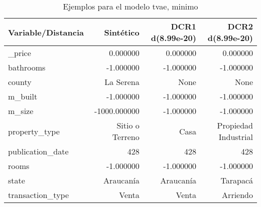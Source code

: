 \begin{table}[H]
\centering
\fontsize{10}{14}\selectfont
\caption{Ejemplos para el modelo tvae, minimo}
\label{table-example-economicos-b-3-tvae-min}
\begin{tabular}{|l|r|r|r|}
\hline
\rowcolor[gray]{0.8}
Variable/Distancia & Sintético & DCR1 d(8.99e-20) & DCR2 d(8.99e-20) \\
\hline \_price & \cellcolor[rgb]{0.9, 0.54, 0.52} 0.000000 & \cellcolor[rgb]{0.9, 0.54, 0.52} 0.000000 & \cellcolor[rgb]{0.9, 0.54, 0.52} 0.000000 \\
\hline bathrooms & \cellcolor[rgb]{0.9, 0.54, 0.52} -1.000000 & \cellcolor[rgb]{0.9, 0.54, 0.52} -1.000000 & \cellcolor[rgb]{0.9, 0.54, 0.52} -1.000000 \\
\hline county & \cellcolor[rgb]{0.9, 0.54, 0.52} La Serena & None & None \\
\hline m\_built & \cellcolor[rgb]{0.9, 0.54, 0.52} -1.000000 & \cellcolor[rgb]{0.9, 0.54, 0.52} -1.000000 & \cellcolor[rgb]{0.9, 0.54, 0.52} -1.000000 \\
\hline m\_size & \cellcolor[rgb]{0.9, 0.54, 0.52} -1000.000000 & \cellcolor[rgb]{0.9, 0.54, 0.52} -1.000000 & \cellcolor[rgb]{0.9, 0.54, 0.52} -1.000000 \\
\hline property\_type & \cellcolor[rgb]{0.9, 0.54, 0.52} Sitio o Terreno & Casa & Propiedad Industrial \\
\hline publication\_date & \cellcolor[rgb]{0.9, 0.54, 0.52} 428 & \cellcolor[rgb]{0.9, 0.54, 0.52} 428 & \cellcolor[rgb]{0.9, 0.54, 0.52} 428 \\
\hline rooms & \cellcolor[rgb]{0.9, 0.54, 0.52} -1.000000 & \cellcolor[rgb]{0.9, 0.54, 0.52} -1.000000 & \cellcolor[rgb]{0.9, 0.54, 0.52} -1.000000 \\
\hline state & \cellcolor[rgb]{0.9, 0.54, 0.52} Araucanía & \cellcolor[rgb]{0.9, 0.54, 0.52} Araucanía & Tarapacá \\
\hline transaction\_type & \cellcolor[rgb]{0.9, 0.54, 0.52} Venta & \cellcolor[rgb]{0.9, 0.54, 0.52} Venta & Arriendo \\
\hline
\end{tabular}
\end{table}
